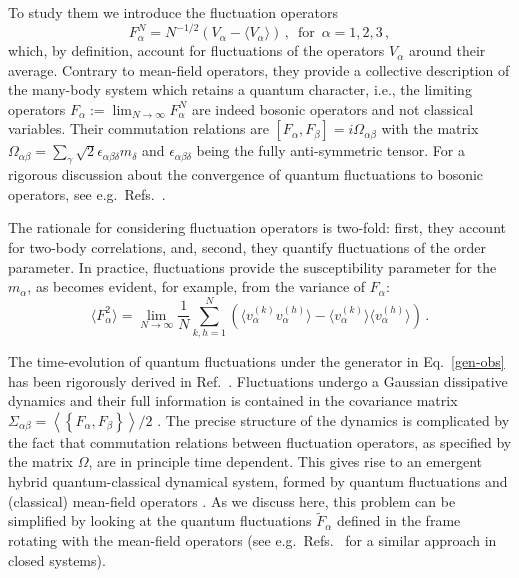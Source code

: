 \documentclass[prl,superscriptaddress,showpacs,longbibliography,reprint]{revtex4-2}
\begin{document}
To study them we introduce the fluctuation operators \cite{goderis1989a,goderis1989b,goderis1990,verbeure2010,benatti2016,benatti2017,benatti2018}
\begin{equation}
    F_\alpha^N=N^{-1/2}\left(V_\alpha -\langle V_\alpha\rangle\right)\, , \, \mbox{ for } \, \alpha=1,2,3\,, 
    \label{fluc-oper}
\end{equation}
which, by definition, account for fluctuations of the operators $V_\alpha$ around their average. Contrary to mean-field operators, they provide a collective description of the many-body system which retains a quantum character, i.e., the limiting operators $F_\alpha:=\lim_{N\to\infty} F_\alpha^N$ are indeed bosonic operators and not classical variables. Their commutation relations are $[F_\alpha,F_\beta]=i \Omega_{\alpha\beta}$ with the matrix  $\Omega_{\alpha\beta}=\sum_{\gamma} \sqrt{2}\epsilon_{\alpha\beta\delta}m_\delta$ and $\epsilon_{\alpha\beta\delta}$ being the fully anti-symmetric tensor. 
For a rigorous discussion about the convergence of quantum fluctuations to bosonic operators, see e.g.~Refs.~\cite{verbeure2010,benatti2017,benatti2018}. 

The rationale for considering fluctuation operators is two-fold: first, they account for two-body correlations, and, second, they quantify fluctuations of the order parameter. In practice, fluctuations provide the susceptibility parameter for the $m_\alpha$, as becomes evident, for example, from the variance of $F_\alpha$:
\begin{equation}
\langle F_\alpha^2\rangle =\lim_{N\to\infty}\frac{1}{N} \sum_{k,h=1}^N \left(\langle v_\alpha^{(k)}v_\alpha^{(h)}\rangle -\langle v_\alpha^{(k)}\rangle \langle v_\alpha^{(h)}\rangle\right) \, .
\label{var-F}
\end{equation}

The time-evolution of quantum fluctuations under the generator in Eq.~\eqref{gen-obs} has been rigorously derived in Ref.~\cite{benatti2018}. Fluctuations undergo a Gaussian dissipative dynamics \cite{heinosaari2010} and their full information is contained in the covariance matrix ${\Sigma}_{\alpha\beta}=\left\langle \left\{F_\alpha ,F_\beta\right\}\right\rangle/2$ \cite{benatti2018}. The precise structure of the dynamics is complicated by the fact that commutation relations between fluctuation operators, as specified by the matrix $\Omega$, are in principle time dependent. This gives rise to an emergent hybrid quantum-classical dynamical system, formed by quantum fluctuations and (classical) mean-field operators \cite{benatti2018}. As we discuss here, this problem can be simplified by looking at the quantum fluctuations $\tilde{F}_\alpha$ defined in the frame rotating with the mean-field operators (see e.g.~Refs.~\cite{pappalardi2018,lerose2020,lerose2020b} for a similar approach in closed systems). 
\end{document}
